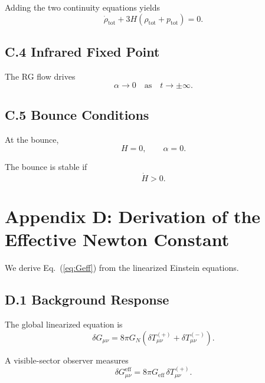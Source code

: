 \documentclass[11pt,a4paper]{article}
\begin{document}
Adding the two continuity equations yields
\begin{equation}
\dot{\rho}_{\mathrm{tot}} + 3H(\rho_{\mathrm{tot}} + p_{\mathrm{tot}}) = 0.
\end{equation}

\subsection*{C.4 Infrared Fixed Point}

The RG flow drives
\begin{equation}
\alpha \to 0 \quad \text{as} \quad t \to \pm \infty.
\end{equation}

\subsection*{C.5 Bounce Conditions}

At the bounce,
\begin{equation}
H = 0, \qquad \alpha = 0.
\end{equation}

The bounce is stable if
\begin{equation}
\dot{H} > 0.
\end{equation}

\section*{Appendix D: Derivation of the Effective Newton Constant}

We derive Eq.~(\ref{eq:Geff}) from the linearized Einstein equations.

\subsection*{D.1 Background Response}

The global linearized equation is
\begin{equation}
\delta G_{\mu\nu} = 8\pi G_N 
\left( \delta T_{\mu\nu}^{(+)} + \delta T_{\mu\nu}^{(-)} \right).
\end{equation}

A visible-sector observer measures
\begin{equation}
\delta G_{\mu\nu}^{\mathrm{eff}} = 
8\pi G_{\mathrm{eff}} \, \delta T_{\mu\nu}^{(+)}.
\end{equation}
\end{document}

